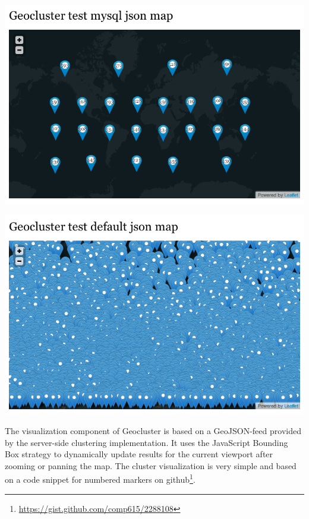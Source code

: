 \begin{itemize}
\hspace*{-1.5cm}\parbox [h]{0.5\textwidth}{
    \includegraphics [width=\linewidth]{figures/map_clustered.png}
    \label{fig:map-clustered}
}
\hfill
\hspace{0.5cm}
\parbox [h]{0.5\textwidth }{
    \includegraphics [width=\linewidth]{figures/map_unclustered.png}
    \label{fig:map-unclustered}
}


The visualization component of Geocluster is based on a GeoJSON-feed provided by the server-side clustering implementation. It uses the JavaScript Bounding Box strategy to dynamically update results for the current viewport after zooming or panning the map. The cluster visualization is very simple and based on a code snippet for numbered markers on github\footnote{\url{https://gist.github.com/comp615/2288108}}.



\end{itemize}
